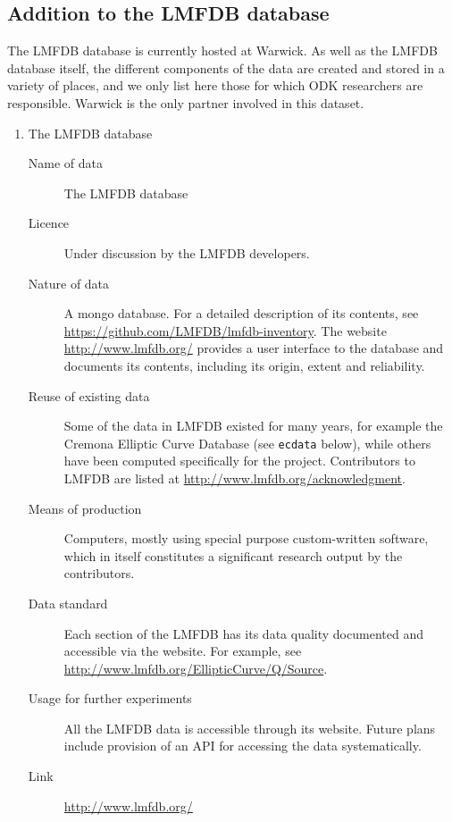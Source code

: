 \documentclass[12pt]{article}
\begin{document}
\subsection{Addition to the LMFDB database}

The LMFDB database is currently
hosted at Warwick.  As well as the LMFDB database itself, the
different components of the data are created and stored in a variety
of places, and we only list here those for which ODK researchers are responsible.
Warwick is the only partner involved  in this dataset.

\begin{enumerate}

\item{The LMFDB database}
\begin{description}
\item[Name of data] The LMFDB database
\item[Licence]  Under discussion by the LMFDB developers.
\item[Nature of data] A mongo database.  For a detailed description of
  its contents, see \url{https://github.com/LMFDB/lmfdb-inventory}.
  The website \url{http://www.lmfdb.org/} provides a user interface to
  the database and documents its contents, including its origin,
  extent and reliability.
\item[Reuse of existing data] Some of the data in LMFDB existed for
  many years, for example the Cremona Elliptic Curve Database (see
  {\tt ecdata} below), while others have been computed specifically
    for the project.   Contributors to LMFDB are listed at
    \url{http://www.lmfdb.org/acknowledgment}.
\item[Means of production] Computers, mostly using special purpose
  custom-written software, which in itself constitutes a significant
  research output by the contributors.
\item[Data standard] Each section of the LMFDB has its data quality
  documented and accessible via the website.  For example, see
  \url{http://www.lmfdb.org/EllipticCurve/Q/Source}.
\item [Usage for further experiments] All the LMFDB data is accessible
  through its website.  Future plans include provision of an API for
  accessing the data systematically.
\item [Link] \url{http://www.lmfdb.org/}
\end{description}


\end{enumerate}
\end{document}
